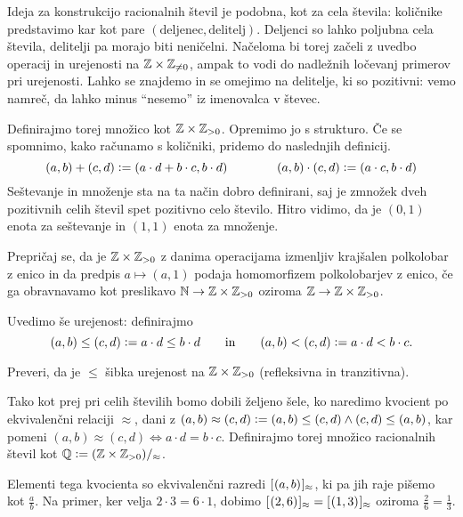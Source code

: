 Ideja za konstrukcijo racionalnih števil je podobna, kot za cela števila: količnike predstavimo kar kot pare $(\text{deljenec}, \text{delitelj})$. Deljenci so lahko poljubna cela števila, delitelji pa morajo biti neničelni. Načeloma bi torej začeli z uvedbo operacij in urejenosti na $\ZZ \times \ZZ_{\neq 0}$, ampak to vodi do nadležnih ločevanj primerov pri urejenosti. Lahko se znajdemo in se omejimo na delitelje, ki so pozitivni: vemo namreč, da lahko minus ``nesemo'' iz imenovalca v števec.

Definirajmo torej množico  kot $\ZZ \times \ZZ_{> 0}$. Opremimo jo s strukturo. Če se spomnimo, kako računamo s količniki, pridemo do naslednjih definicij.
\[(a, b) + (c, d) \dfeq (a \cdot d + b \cdot c, b \cdot d) \qquad\qquad (a, b) \cdot (c, d) \dfeq (a \cdot c, b \cdot d)\]
Seštevanje in množenje sta na ta način dobro definirani, saj je zmnožek dveh pozitivnih celih števil spet pozitivno celo število.  Hitro vidimo, da je $(0, 1)$ enota za seštevanje in $(1, 1)$ enota za množenje.

\begin{naloga}
Prepričaj se, da je $\ZZ \times \ZZ_{> 0}$ z danima operacijama izmenljiv krajšalen polkolobar z enico in da predpis $a \mapsto (a, 1)$ podaja homomorfizem polkolobarjev z enico, če ga obravnavamo kot preslikavo $\NN \to \ZZ \times \ZZ_{> 0}$ oziroma $\ZZ \to \ZZ \times \ZZ_{> 0}$.
\end{naloga}

Uvedimo še urejenost: definirajmo
\[(a, b) \leq (c, d) \dfeq a \cdot d \leq b \cdot d \qquad \text{in} \qquad (a, b) < (c, d) \dfeq a \cdot d < b \cdot c.\]

\begin{naloga}
Preveri, da je $\leq$ šibka urejenost na $\ZZ \times \ZZ_{> 0}$ (refleksivna in tranzitivna).
\end{naloga}

Tako kot prej pri celih številih bomo dobili željeno šele, ko naredimo kvocient po ekvivalenčni relaciji $\approx$, dani z $(a, b) \approx (c, d) \dfeq (a, b) \leq (c, d) \land (c, d) \leq (a, b)$, kar pomeni $(a, b) \approx (c, d) \iff a \cdot d = b \cdot c$. Definirajmo torej množico racionalnih števil kot $\QQ \dfeq (\ZZ \times \ZZ_{> 0})/_\approx$.

Elementi tega kvocienta so ekvivalenčni razredi $\ec[\approx]{(a, b)}$, ki pa jih raje pišemo kot $\frac{a}{b}$. Na primer, ker velja $2 \cdot 3 = 6 \cdot 1$, dobimo $\ec[\approx]{(2, 6)} = \ec[\approx]{(1, 3)}$ oziroma $\frac{2}{6} = \frac{1}{3}$. 

